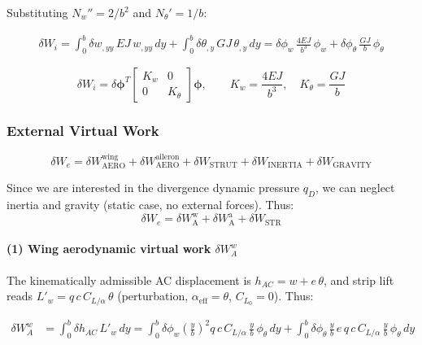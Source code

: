 Substituting $N_w'' = 2/b^2$ and $N_\theta' = 1/b$:

\begin{align}
\delta W_i = \int_0^b \delta w_{,yy}\,EJ\,w_{,yy}\,dy + \int_0^b \delta\theta_{,y}\,GJ\,\theta_{,y}\,dy = \delta\phi_w\,\frac{4EJ}{b^3}\,\phi_w + \delta\phi_\theta\,\frac{GJ}{b}\,\phi_\theta
\end{align}

\begin{equation}
\boxed{
\delta W_i = \delta\boldsymbol{\phi}^T
\begin{bmatrix} K_w & 0 \\ 0 & K_\theta \end{bmatrix}
\boldsymbol{\phi}, \qquad
K_w = \frac{4EJ}{b^3}, \quad K_\theta = \frac{GJ}{b}
}
\end{equation}

\subsubsection*{External Virtual Work}

\[
\delta W_e = \delta W_{\text{AERO}}^{\text{wing}} + \delta W_{\text{AERO}}^{\text{aileron}} + \delta W_{\mathrm{STRUT}} + \delta W_{\text{INERTIA}} + \delta W_{\text{GRAVITY}}
\]

Since we are interested in the divergence dynamic pressure $q_D$, we can neglect inertia and gravity (static case, no external forces). Thus:
\[
\boxed{\delta W_e = \delta W_{\text{A}}^{\text{w}} + \delta W_{\text{A}}^{\text{a}} + \delta W_{\mathrm{STR}}}
\]


\paragraph{(1) Wing aerodynamic virtual work $\delta W_A^w$}

The kinematically admissible AC displacement is $h_{AC} = w + e\,\theta$, and strip lift reads
$L'_w = q\,c\,C_{L/\alpha}\,\theta$ (perturbation, $\alpha_\mathrm{eff}=\theta$, $C_{L_0}=0$). Thus:

\begin{align}
\delta W_A^w &= \int_0^b \delta h_{AC}\,L'_w\,dy
= \int_0^b \delta\phi_w \left(\frac{y}{b}\right)^2 q\,c\,C_{L/\alpha}\,\frac{y}{b}\,\phi_\theta\,dy
+ \int_0^b \delta\phi_\theta\,\frac{y}{b}\,e\,q\,c\,C_{L/\alpha}\,\frac{y}{b}\,\phi_\theta\,dy
\end{align}

